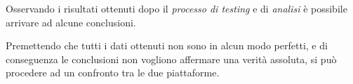 Osservando i risultati ottenuti dopo il \textit{processo di testing} e di \textit{analisi} è possibile arrivare ad alcune conclusioni.

Premettendo che tutti i dati ottenuti non sono in alcun modo perfetti, e di conseguenza le conclusioni non vogliono affermare una verità assoluta, si può procedere ad un confronto tra le due piattaforme.